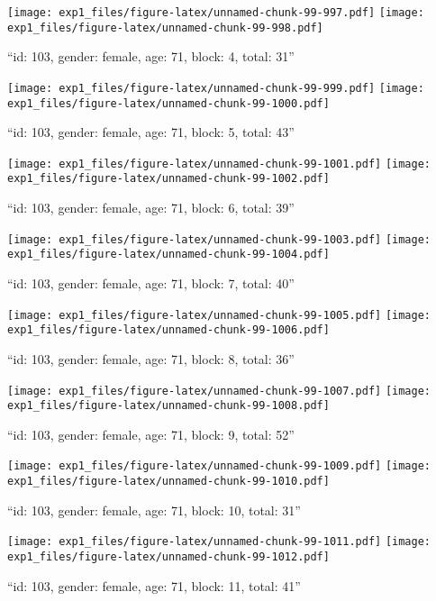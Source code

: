 \documentclass[,]{article}
\begin{document}
\texttt{[image: exp1\_files/figure-latex/unnamed-chunk-99-997.pdf]}
\texttt{[image: exp1\_files/figure-latex/unnamed-chunk-99-998.pdf]}

\newpage
[1] 

``id: 103, gender: female, age: 71, block: 4, total: 31''

\texttt{[image: exp1\_files/figure-latex/unnamed-chunk-99-999.pdf]}
\texttt{[image: exp1\_files/figure-latex/unnamed-chunk-99-1000.pdf]}

\newpage
[1] 

``id: 103, gender: female, age: 71, block: 5, total: 43''

\texttt{[image: exp1\_files/figure-latex/unnamed-chunk-99-1001.pdf]}
\texttt{[image: exp1\_files/figure-latex/unnamed-chunk-99-1002.pdf]}

\newpage
[1] 

``id: 103, gender: female, age: 71, block: 6, total: 39''

\texttt{[image: exp1\_files/figure-latex/unnamed-chunk-99-1003.pdf]}
\texttt{[image: exp1\_files/figure-latex/unnamed-chunk-99-1004.pdf]}

\newpage
[1] 

``id: 103, gender: female, age: 71, block: 7, total: 40''

\texttt{[image: exp1\_files/figure-latex/unnamed-chunk-99-1005.pdf]}
\texttt{[image: exp1\_files/figure-latex/unnamed-chunk-99-1006.pdf]}

\newpage
[1] 

``id: 103, gender: female, age: 71, block: 8, total: 36''

\texttt{[image: exp1\_files/figure-latex/unnamed-chunk-99-1007.pdf]}
\texttt{[image: exp1\_files/figure-latex/unnamed-chunk-99-1008.pdf]}

\newpage
[1] 

``id: 103, gender: female, age: 71, block: 9, total: 52''

\texttt{[image: exp1\_files/figure-latex/unnamed-chunk-99-1009.pdf]}
\texttt{[image: exp1\_files/figure-latex/unnamed-chunk-99-1010.pdf]}

\newpage
[1] 

``id: 103, gender: female, age: 71, block: 10, total: 31''

\texttt{[image: exp1\_files/figure-latex/unnamed-chunk-99-1011.pdf]}
\texttt{[image: exp1\_files/figure-latex/unnamed-chunk-99-1012.pdf]}

\newpage
[1] 

``id: 103, gender: female, age: 71, block: 11, total: 41''
\end{document}
